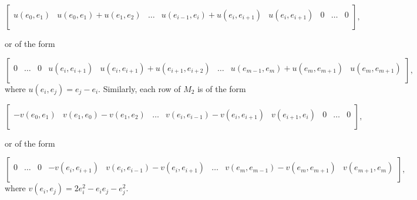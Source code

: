 \documentclass{article}
\begin{document}
\[
\begin{bmatrix}
u(e_{0},e_{1}) & u(e_{0},e_{1}) + u(e_{1},e_{2}) & \ldots & u(e_{i-1},e_{i}) + u
(e_{i},e_{i+1}) & u(e_{i},e_{i+1})& 0 & \ldots & 0\\
\end{bmatrix},
\]

or of the form

\[
\begin{bmatrix}
0 & \ldots & 0 & u(e_{i},e_{i+1}) & u(e_{i},e_{i+1}) + u(e_{i+1},e_{i+2}) &
\ldots & u(e_{m-1},e_{m}) + u(e_{m},e_{m+1}) & u(e_{m},e_{m+1})\\
\end{bmatrix},
\]
where $u(e_i,e_j) = {e_j - e_i}$. Similarly,
each row of $M_2$ is of the form

\[
\begin{bmatrix}
-v(e_{0},e_{1}) & v(e_{1},e_{0}) - v(e_{1},e_{2}) & \ldots & v(e_{i},e_{i-1}) -
v(e_{i},e_{i+1}) & v(e_{i+1},e_{i})& 0 & \ldots & 0\\
\end{bmatrix},
\]

or of the form

\[
\begin{bmatrix}
0 & \ldots & 0 & -v(e_{i},e_{i+1}) & v(e_{i},e_{i-1}) - v(e_{i},e_{i+1}) &
\ldots & v(e_{m},e_{m-1}) - v(e_{m},e_{m+1}) & v(e_{m+1},e_{m})\\
\end{bmatrix},
\]
where $v(e_i,e_j) = {2e_i^2 - e_i e_j - e_j^2}$.
\end{document}
